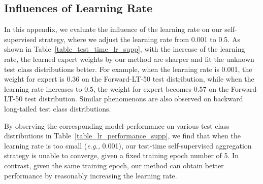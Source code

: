 \documentclass{article}
\def\eg{\emph{e.g.}} \def\Eg{\emph{E.g.}}
\def\eg{\emph{e.g., }}
\begin{document}
 

 \newpage
\subsection{Influences of Learning Rate}
 In this appendix, we  evaluate the influence of the  learning rate on our self-supervised strategy, where we adjust the learning rate from 0.001 to 0.5. As shown in Table~\ref{table_test_time_lr_supp}, with the increase of the learning rate, the learned expert weights by our method are   sharper and fit  the unknown test class distributions better. For example, when the learning rate is 0.001, the weight for expert  is 0.36 on the Forward-LT-50 test distribution, while when the learning rate increases to 0.5, the weight for expert  becomes 0.57 on the Forward-LT-50 test distribution.  Similar phenomenons 
are also   observed on backward long-tailed test class distributions. 


  By  observing the corresponding model performance on various test class distributions in Table~\ref{table_lr_performance_supp}, we find that when the learning rate is too small (\eg 0.001), our test-time self-supervised aggregation strategy is unable to  converge, given a fixed training epoch number of 5. In contrast, given the same training epoch, our method can obtain better performance by reasonably increasing the learning rate. 
 
\end{document}
